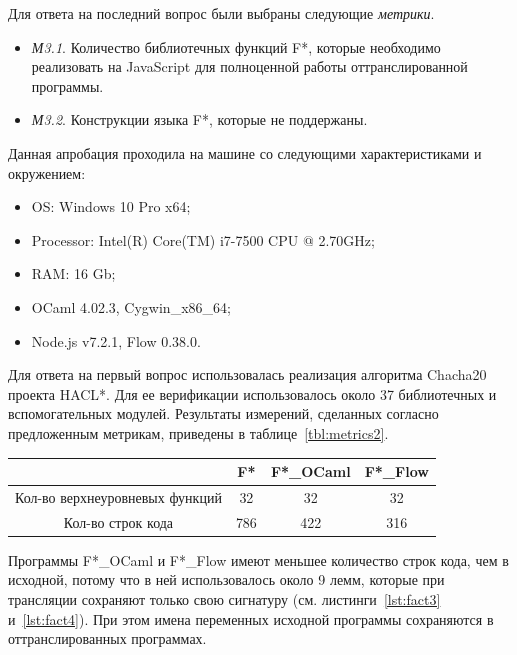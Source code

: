 Для ответа на последний вопрос были выбраны следующие \textit{метрики}.

\begin{itemize}
\item[] \textit{М3.1}. Количество библиотечных функций F*, которые необходимо реализовать на JavaScript для полноценной работы оттранслированной программы. 
\item[] \textit{М3.2}. Конструкции языка F*, которые не поддержаны.
\end{itemize}

Данная апробация проходила на машине со следующими характеристиками и окружением:

\begin{itemize}
\item OS: Windows 10 Pro x64;
\item Processor: Intel(R) Core(TM) i7-7500 CPU @ 2.70GHz;
\item RAM: 16 Gb;
\item OCaml 4.02.3, Cygwin\_x86\_64;
\item Node.js v7.2.1, Flow 0.38.0.
\end{itemize}

Для ответа на первый вопрос использовалась реализация алгоритма Chacha20~\cite{chacha} проекта HACL*. Для ее верификации использовалось около 37 библиотечных и вспомогательных модулей. Результаты измерений, сделанных согласно предложенным метрикам, приведены в таблице~\ref{tbl:metrics2}. 

\begin{center}  
\begin{tabular}{ | c | c | c | c | }
    \hline
      & F* & F*\_OCaml & F*\_Flow \\ \hline
    Кол-во верхнеуровневых функций & 32 & 32 & 32 \\ \hline
    Кол-во строк кода & 786 & 422 & 316 \\
    \hline
\end{tabular}
\captionsetup{type=table}
\label{tbl:metrics2} 
\end{center}

Программы F*\_OCaml и F*\_Flow  имеют меньшее количество строк кода, чем в исходной, потому что в ней использовалось около 9 лемм, которые при трансляции сохраняют только свою сигнатуру (см. листинги~\ref{lst:fact3} и~\ref{lst:fact4}). При этом имена переменных исходной программы сохраняются в оттранслированных программах.

